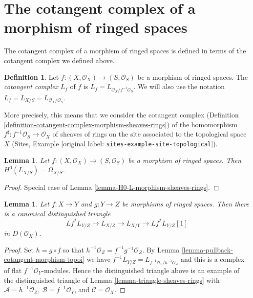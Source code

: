 \documentclass[10pt,a4paper]{article}
\theoremstyle{plain}
\newtheorem{lemma}[subsection]{Lemma}
\theoremstyle{definition}
\newtheorem{definition}[subsection]{Definition}
\theoremstyle{remark}
\numberwithin{equation}{subsection}
\begin{document}
\section{The cotangent complex of a morphism of ringed spaces}
\label{section-cotangent-morphism-ringed-spaces}

\noindent
The cotangent complex of a morphism of ringed spaces is defined
in terms of the cotangent complex we defined above.

\begin{definition}
\label{definition-cotangent-complex-morphism-ringed-spaces}
Let $f : (X, \mathcal{O}_X) \to (S, \mathcal{O}_S)$ be a morphism of
ringed spaces. The {\it cotangent complex} $L_f$ of $f$ is
$L_f = L_{\mathcal{O}_X/f^{-1}\mathcal{O}_S}$.
We will also use the notation
$L_f = L_{X/S} = L_{\mathcal{O}_X/\mathcal{O}_S}$.
\end{definition}

\noindent
More precisely, this means that we consider the cotangent complex
(Definition \ref{definition-cotangent-complex-morphism-sheaves-rings})
of the homomorphism $f^\sharp : f^{-1}\mathcal{O}_S \to \mathcal{O}_X$
of sheaves of rings on the site associated to the topological space $X$
(Sites, Example \textnormal{[original label: \nolinkurl{sites-example-site-topological}]}).

\begin{lemma}
\label{lemma-H0-L-morphism-ringed-spaces}
Let $f : (X, \mathcal{O}_X) \to (S, \mathcal{O}_S)$ be a morphism of
ringed spaces. Then $H^0(L_{X/S}) = \Omega_{X/S}$.
\end{lemma}

\begin{proof}
Special case of Lemma \ref{lemma-H0-L-morphism-sheaves-rings}.
\end{proof}

\begin{lemma}
\label{lemma-triangle-ringed-spaces}
Let $f : X \to Y$ and $g : Y \to Z$ be morphisms of ringed spaces.
Then there is a canonical distinguished triangle
$$
Lf^* L_{Y/Z} \to L_{X/Z} \to L_{X/Y} \to Lf^*L_{Y/Z}[1]
$$
in $D(\mathcal{O}_X)$.
\end{lemma}

\begin{proof}
Set $h = g \circ f$ so that $h^{-1}\mathcal{O}_Z = f^{-1}g^{-1}\mathcal{O}_Z$.
By Lemma \ref{lemma-pullback-cotangent-morphism-topoi} we have
$f^{-1}L_{Y/Z} = L_{f^{-1}\mathcal{O}_Y/h^{-1}\mathcal{O}_Z}$
and this is a complex of flat $f^{-1}\mathcal{O}_Y$-modules.
Hence the distinguished triangle above is an example of the
distinguished triangle of
Lemma \ref{lemma-triangle-sheaves-rings}
with $\mathcal{A} = h^{-1}\mathcal{O}_Z$, $\mathcal{B} = f^{-1}\mathcal{O}_Y$,
and $\mathcal{C} = \mathcal{O}_X$.
\end{proof}
\end{document}
